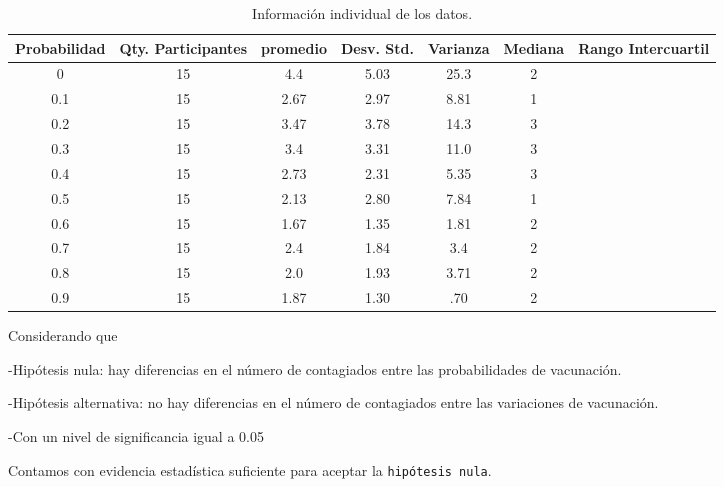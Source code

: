\documentclass{article}
\begin{document}
\begin{table}[ht]
    \centering
    \caption{Informaci\'on individual de los datos.} 
    \begin{tabular}{|c|c|c|c|c|c|c|}
    \hline
    Probabilidad & Qty. Participantes & promedio & Desv. Std. & Varianza & Mediana & Rango Intercuartil  \\
    \hline
    0 & 15 & 4.4 & 5.03 & 25.3 & 2 & \\
    \hline
    0.1 & 15 & 2.67 & 2.97 & 8.81 & 1 & \\
    \hline
    0.2 & 15 & 3.47 & 3.78 & 14.3 & 3 & \\
    \hline
    0.3 & 15 & 3.4 & 3.31 & 11.0 & 3 & \\
    \hline
    0.4 & 15 & 2.73 & 2.31 & 5.35 & 3 & \\
    \hline
    0.5 & 15 & 2.13 & 2.80 & 7.84 & 1 & \\
    \hline
    0.6 & 15 & 1.67 & 1.35 & 1.81 & 2 & \\
    \hline
    0.7 & 15 & 2.4 & 1.84 & 3.4 & 2 & \\
    \hline
    0.8 & 15 & 2.0 & 1.93 & 3.71 & 2 & \\
    \hline
    0.9 & 15 & 1.87 & 1.30 & .70 & 2 & \\
    \hline
\end{tabular}
    \label{cuadro 4}
\end{table}

\bigskip

Considerando que 

-Hip\'otesis nula: hay diferencias en el n\'umero de contagiados entre las probabilidades de vacunaci\'on.

-Hip\'otesis alternativa: no hay diferencias en el n\'umero de contagiados entre las variaciones de vacunaci\'on.

-Con un nivel de significancia igual a 0.05

Contamos con evidencia estad\'istica suficiente para aceptar la \texttt{hip\'otesis nula}.
\end{document}
